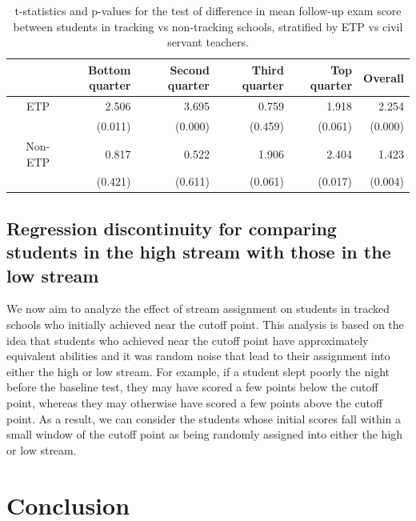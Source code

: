 \documentclass[11pt]{article}
\begin{document}
\begin{table}[ht]
\centering
\begin{tabular}{rrrrrr}
  \hline
 & Bottom quarter & Second quarter & Third quarter & Top quarter & Overall \\ 
  \hline
  ETP & 2.506 & 3.695 & 0.759 & 1.918 & 2.254 \\ 
   & (0.011) & (0.000) & (0.459) & (0.061) & (0.000) \\ 
  Non-ETP & 0.817 & 0.522 & 1.906 & 2.404 & 1.423 \\ 
   & (0.421) & (0.611) & (0.061) & (0.017) & (0.004) \\ 
   \hline
\end{tabular}
\caption{t-statistics and p-values for the test of difference in mean follow-up exam score between students in tracking vs non-tracking schools, stratified by ETP vs civil servant teachers.} 
\end{table} %


 \subsection{Regression discontinuity for comparing students in the high stream with those in the low stream}
We now aim to analyze the effect of stream assignment on students in tracked schools who initially achieved near the cutoff point. This analysis is based on the idea that students who achieved near the cutoff point have approximately equivalent abilities and it was random noise that lead to their assignment into either the high or low stream. For example, if a student slept poorly the night before the baseline test, they may have scored a few points below the cutoff point, whereas they may otherwise have scored a few points above the cutoff point. As a result, we can consider the students whose initial scores fall within a small window of the cutoff point as being randomly assigned into either the high or low stream.
 
 
 
 \section{Conclusion}
 
 
 

 
\end{document}
